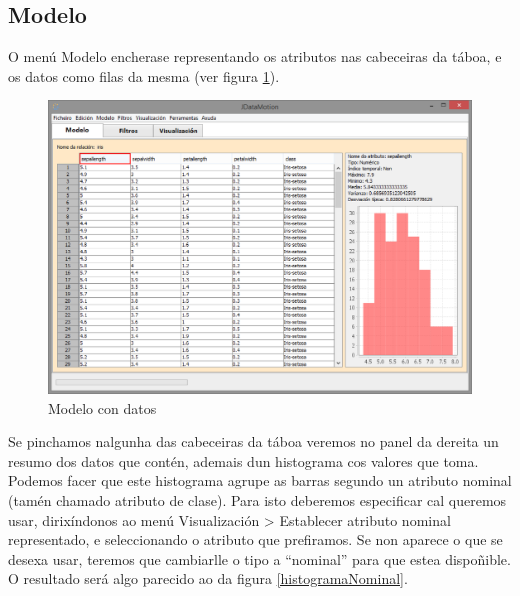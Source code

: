 \subsection{Modelo}

O menú Modelo encherase representando os atributos nas cabeceiras da táboa, e os datos como filas da mesma (ver figura \ref{manualModelo}).

\begin{figure}
\centering
\includegraphics[width=\textwidth,height=\textheight,keepaspectratio]{figuras/manualModelo}
\caption{Modelo con datos}
\label{manualModelo}
\end{figure}

Se pinchamos nalgunha das cabeceiras da táboa veremos no panel da dereita un resumo dos datos que contén, ademais dun histograma cos valores que toma. Podemos facer que este histograma agrupe as barras segundo un atributo nominal (tamén chamado atributo de clase). Para isto deberemos especificar cal queremos usar, dirixíndonos ao menú Visualización \textgreater{} Establecer atributo nominal representado, e seleccionando o atributo que prefiramos. Se non aparece o que se desexa usar, teremos que cambiarlle o tipo a ``nominal'' para que estea dispoñible. O resultado será algo parecido ao da figura \ref{histogramaNominal}.

